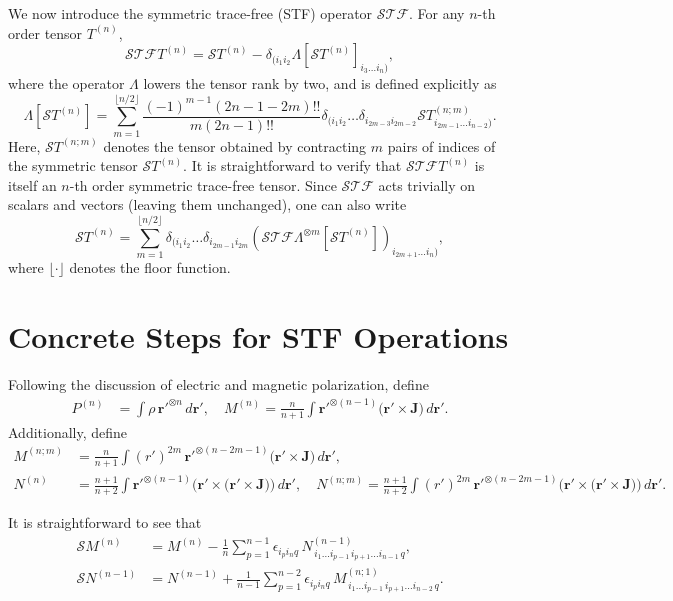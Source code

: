 \documentclass{article}
\begin{document}
\medskip
We now introduce the symmetric trace-free (STF) operator $\mathcal{STF}$.  
For any $n$-th order tensor $T^{(n)}$,
\[
\mathcal{STF} T^{(n)} = \mathcal{S} T^{(n)} - \delta_{(i_1 i_2} \Lambda[\mathcal{S} T^{(n)}]_{i_3 \dots i_n)},
\]
where the operator $\Lambda$ lowers the tensor rank by two, and is defined explicitly as
\[
\Lambda[\mathcal{S} T^{(n)}] =
\sum_{m=1}^{\lfloor n/2 \rfloor}
\frac{(-1)^{m-1} (2n - 1 - 2m)!!}{m (2n - 1)!!}
\delta_{(i_1 i_2} \dots \delta_{i_{2m-3} i_{2m-2}}
\mathcal{S} T^{(n;m)}_{i_{2m-1} \dots i_{n-2})}.
\]
Here, $\mathcal{S}T^{(n;m)}$ denotes the tensor obtained by contracting $m$ pairs of indices of the symmetric tensor $\mathcal{S}T^{(n)}$.  
It is straightforward to verify that $\mathcal{STF}T^{(n)}$ is itself an $n$-th order symmetric trace-free tensor.  
Since $\mathcal{STF}$ acts trivially on scalars and vectors (leaving them unchanged), one can also write
\[
\mathcal{S}T^{(n)} = \sum_{m=1}^{\lfloor n/2 \rfloor}
\delta_{(i_1 i_2} \dots \delta_{i_{2m-1} i_{2m}}
\left( \mathcal{STF}\Lambda^{\otimes m}[\mathcal{S}T^{(n)}] \right)_{i_{2m+1} \dots i_n)},
\]
where $\lfloor \cdot \rfloor$ denotes the floor function.
	
	\section{Concrete Steps for STF Operations}
	
	Following the discussion of electric and magnetic polarization, define
	\[
	\begin{split}
		P^{(n)} &= \int \rho\, \bm{r}'^{\otimes n}\, d\bm{r}', \quad
		M^{(n)} = \frac{n}{n+1} \int \bm{r}'^{\otimes (n-1)} \big( \bm{r}' \times \bm{J} \big)\, d\bm{r}' .
	\end{split}
	\]
	Additionally, define
	\[
	\begin{split}
		M^{(n;m)} &= \frac{n}{n+1} \int (r')^{2m}\, \bm{r}'^{\otimes (n-2m-1)} \big( \bm{r}' \times \bm{J} \big)\, d\bm{r}', \\
		N^{(n)} &= \frac{n+1}{n+2} \int \bm{r}'^{\otimes (n-1)} \Big( \bm{r}' \times \big( \bm{r}' \times \bm{J} \big) \Big)\, d\bm{r}', \quad
		N^{(n;m)} = \frac{n+1}{n+2} \int (r')^{2m}\, \bm{r}'^{\otimes (n-2m-1)} \Big( \bm{r}' \times \big( \bm{r}' \times \bm{J} \big) \Big)\, d\bm{r}' .
	\end{split}
	\]
	
	It is straightforward to see that
	\[
	\begin{split}
		\mathcal{S} M^{(n)} &= M^{(n)} - \frac{1}{n} \sum_{p=1}^{n-1} \epsilon_{i_p i_n q}\, N^{(n-1)}_{\,i_1 \dots i_{p-1}\, i_{p+1} \dots i_{n-1}\, q}, \\
		\mathcal{S} N^{(n-1)} &= N^{(n-1)} + \frac{1}{n-1} \sum_{p=1}^{n-2} \epsilon_{i_p i_n q}\, M^{(n;1)}_{\,i_1 \dots i_{p-1}\, i_{p+1} \dots i_{n-2}\, q}.
	\end{split}
	\]
	
\end{document}
